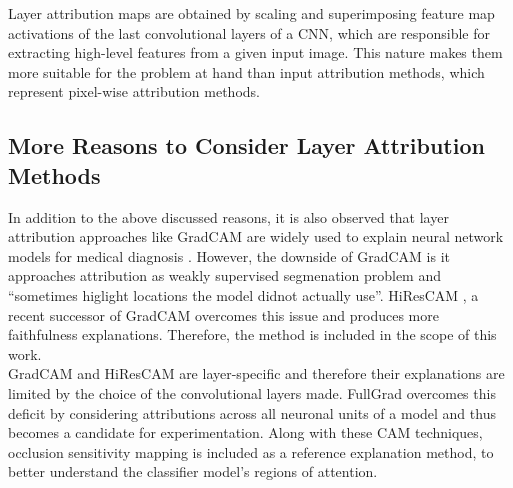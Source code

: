 \documentclass[../report.tex]{subfiles}
\begin{document}
\begin{itemize}
    	Layer attribution maps are obtained by scaling and superimposing feature map activations of the last convolutional layers of a CNN, which are responsible for extracting high-level features from a given input image. This nature makes them more suitable for the problem at hand than input attribution methods, which represent pixel-wise attribution methods.
    \end{itemize}
	
    \subsection{More Reasons to Consider Layer Attribution Methods}
    In addition to the above discussed reasons, it is also observed that layer attribution approaches like GradCAM are widely used to explain neural network models for medical diagnosis \cite{} \cite{} \cite{}. However, the downside of GradCAM is it approaches
    attribution as weakly supervised segmenation problem and \enquote{sometimes higlight locations the model didnot actually use}\cite{draelos2020hirescam}. HiResCAM \cite{draelos2020hirescam}, a recent successor of GradCAM overcomes this issue and produces more faithfulness explanations. Therefore, the method is included in the scope of this work.\\
    GradCAM and HiResCAM are layer-specific and therefore their explanations are limited by the choice of the convolutional layers made. FullGrad \cite{srinivas2019full} overcomes this deficit by considering attributions across all neuronal units of a model and thus becomes a candidate for experimentation. Along with these CAM techniques, occlusion sensitivity mapping is included as a reference explanation method, to better understand the classifier model's regions of attention.
\end{document}

